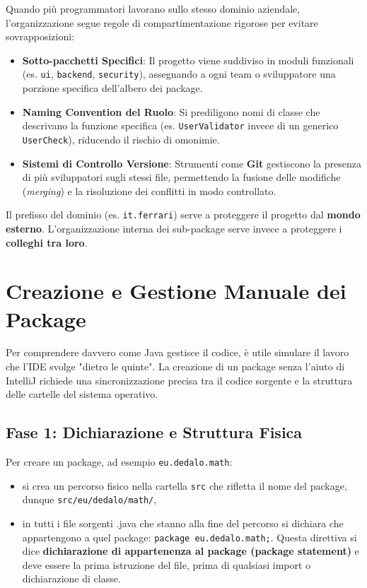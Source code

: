 Quando più programmatori lavorano sullo stesso dominio aziendale, l'organizzazione segue regole di compartimentazione rigorose per evitare sovrapposizioni:

\begin{itemize}
    \item \textbf{Sotto-pacchetti Specifici}: Il progetto viene suddiviso in moduli funzionali (es. \texttt{ui}, \texttt{backend}, \texttt{security}), assegnando a ogni team o sviluppatore una porzione specifica dell'albero dei package.
    \item \textbf{Naming Convention del Ruolo}: Si prediligono nomi di classe che descrivano la funzione specifica (es. \texttt{UserValidator} invece di un generico \texttt{UserCheck}), riducendo il rischio di omonimie.
    \item \textbf{Sistemi di Controllo Versione}: Strumenti come \textbf{Git} gestiscono la presenza di più sviluppatori sugli stessi file, permettendo la fusione delle modifiche (\textit{merging}) e la risoluzione dei conflitti in modo controllato.
\end{itemize}

\begin{tip}
    Il prefisso del dominio (es. \texttt{it.ferrari}) serve a proteggere il progetto dal \textbf{mondo esterno}. L'organizzazione interna dei sub-package serve invece a proteggere i \textbf{colleghi tra loro}.
\end{tip}

\section{Creazione e Gestione Manuale dei Package}

Per comprendere davvero come Java gestisce il codice, è utile simulare il lavoro che l'IDE svolge "dietro le quinte". La creazione di un package senza l'aiuto di IntelliJ richiede una sincronizzazione precisa tra il codice sorgente e la struttura delle cartelle del sistema operativo.

\subsection*{Fase 1: Dichiarazione e Struttura Fisica}
Per creare un package, ad esempio \texttt{eu.dedalo.math}:
\begin{itemize}
  \item si crea un percorso fisico nella cartella \texttt{src} che rifletta il nome del package, dunque \texttt{src/eu/dedalo/math/},
  \item in tutti i file sorgenti .java che stanno alla fine del percorso si dichiara che appartengono a quel package: \texttt{package eu.dedalo.math;}. Questa direttiva si dice \textbf{dichiarazione di appartenenza al package (package statement)} e deve essere la prima istruzione del file, prima di qualsiasi import o dichiarazione di classe.
\end{itemize}

